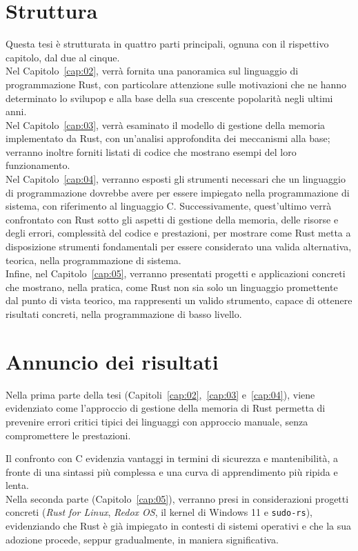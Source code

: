 \section{Struttura} 
Questa tesi è strutturata in quattro parti principali, ognuna con il rispettivo 
capitolo, dal due al cinque. \hfill
\vspace{7pt}\\
\noindent Nel Capitolo~\ref{cap:02}, verrà fornita una panoramica sul linguaggio di programmazione Rust, con particolare attenzione sulle motivazioni 
che ne hanno determinato lo svilupop e alla base della sua crescente popolarità negli ultimi anni. \hfill
\vspace{7pt}\\
\noindent Nel Capitolo~\ref{cap:03}, verrà esaminato il modello di gestione della memoria implementato da Rust,
con un'analisi approfondita dei meccanismi alla base; verranno inoltre forniti listati di codice che mostrano esempi del loro funzionamento. \hfill
\vspace{7pt}\\
\noindent Nel Capitolo~\ref{cap:04}, verranno esposti gli strumenti necessari che un linguaggio di programmazione dovrebbe avere per essere impiegato 
nella programmazione di sistema, con riferimento al linguaggio C. 
Successivamente, quest'ultimo verrà confrontato con Rust sotto gli aspetti di 
gestione della memoria, delle risorse e degli errori, complessità del codice e prestazioni, per mostrare come Rust metta a disposizione strumenti 
fondamentali per essere considerato una valida alternativa, teorica, nella programmazione di sistema. \hfill
\vspace{7pt}\\
\noindent Infine, nel Capitolo~\ref{cap:05}, verranno presentati progetti e applicazioni concreti che mostrano, nella pratica, come 
Rust non sia solo un linguaggio promettente dal punto di vista teorico, ma rappresenti un valido strumento, capace di ottenere risultati concreti, nella programmazione di basso livello.

\section{Annuncio dei risultati}
Nella prima parte della tesi (Capitoli~\ref{cap:02},~\ref{cap:03} e~\ref{cap:04}), viene evidenziato come l'approccio di gestione della memoria di Rust permetta 
di prevenire errori critici tipici dei linguaggi con approccio manuale, senza compromettere le prestazioni.

Il confronto con C evidenzia vantaggi in termini di sicurezza e mantenibilità, a fronte di una sintassi più complessa 
e una curva di apprendimento più ripida e lenta. \hfill 
\vspace{8pt}\\
\noindent Nella seconda parte (Capitolo~\ref{cap:05}), verranno presi in considerazioni progetti concreti (\textit{Rust for Linux}, \textit{Redox OS}, il kernel di Windows 11 e \texttt{sudo-rs}), 
evidenziando che Rust è già impiegato in contesti di sistemi operativi e che la sua adozione procede, seppur gradualmente, in maniera significativa. 